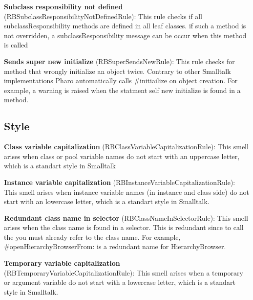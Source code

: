 \textbf{Subclass responsibility not defined} (RBSubclassResponsibilityNotDefinedRule): This rule checks if all subclassResponsibility methods are defined in all leaf classes. if such a method is not overridden, a subclassResponsibility message can be occur when this method is called

\textbf{Sends super new initialize} (RBSuperSendsNewRule):  This rule checks for method that wrongly initialize an object twice. Contrary to other Smalltalk implementations Pharo automatically calls \#initiailize on object creation.
For example, a warning is raised when the statment self new initialize is found in a method.

\subsection{Style}
\textbf{Class variable capitalization} (RBClassVariableCapitalizationRule): This smell arises when class or pool variable names do not start with an uppercase letter, which is a standart style in Smalltalk

\textbf{Instance variable capitalization} (RBInstanceVariableCapitalizationRule): This smell arises when instance variable names (in instance and class side) do not start with an lowercase letter, which is a standart style in Smalltalk.

\textbf{Redundant class name in selector} (RBClassNameInSelectorRule): This smell arises when the class name is found in a selector. This is redundant since to call the you must already refer to the class name. For example, \#openHierarchyBrowserFrom: is a redundant name for HierarchyBrowser.

\textbf{Temporary variable capitalization} (RBTemporaryVariableCapitalizationRule): This smell arises when a temporary or argument variable do not start with a lowercase letter, which is a standart style in Smalltalk.

